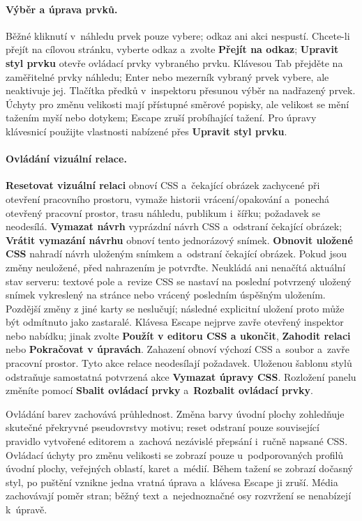 \documentclass[11pt,a4paper]{article}
\newcommand{\ui}[1]{\textbf{#1}}
\begin{document}
\paragraph{Výběr a úprava prvků.} Běžné kliknutí v~náhledu prvek pouze vybere;
odkaz ani akci nespustí. Chcete-li přejít na cílovou stránku, vyberte odkaz
a~zvolte \ui{Přejít na odkaz}; \ui{Upravit styl prvku} otevře ovládací prvky
vybraného prvku. Klávesou Tab přejděte na zaměřitelné prvky náhledu; Enter nebo
mezerník vybraný prvek vybere, ale neaktivuje jej. Tlačítka předků v~inspektoru
přesunou výběr na nadřazený prvek. Úchyty pro změnu velikosti mají přístupné
směrové popisky, ale velikost se mění tažením myší nebo dotykem; Escape zruší
probíhající tažení. Pro úpravy klávesnicí použijte vlastnosti nabízené přes
\ui{Upravit styl prvku}.

\paragraph{Ovládání vizuální relace.} \ui{Resetovat vizuální relaci} obnoví CSS
a~čekající obrázek zachycené při otevření pracovního prostoru, vymaže historii
vrácení/opakování a~ponechá otevřený pracovní prostor, trasu náhledu, publikum
i~šířku; požadavek se neodesílá. \ui{Vymazat návrh} vyprázdní návrh CSS
a~odstraní čekající obrázek; \ui{Vrátit vymazání návrhu} obnoví tento
jednorázový snímek. \ui{Obnovit uložené CSS} nahradí návrh uloženým snímkem
a~odstraní čekající obrázek. Pokud jsou změny neuložené, před nahrazením je
potvrďte. Neukládá ani nenačítá aktuální stav serveru: textové pole a~revize CSS
se nastaví na poslední potvrzený uložený snímek vykreslený na stránce nebo
vrácený posledním úspěšným uložením. Pozdější změny z jiné karty se neslučují;
následné explicitní uložení proto může být odmítnuto jako zastaralé. Klávesa
Escape nejprve zavře otevřený inspektor nebo nabídku; jinak zvolte \ui{Použít v
editoru CSS a ukončit}, \ui{Zahodit relaci} nebo \ui{Pokračovat v úpravách}.
Zahazení obnoví výchozí CSS a~soubor a~zavře pracovní prostor. Tyto akce relace
neodesílají požadavek. Uloženou šablonu stylů odstraňuje samostatná potvrzená
akce \ui{Vymazat úpravy CSS}. Rozložení panelu změníte pomocí \ui{Sbalit
ovládací prvky} a~\ui{Rozbalit ovládací prvky}.

Ovládání barev zachovává průhlednost. Změna barvy úvodní plochy zohledňuje
skutečné překryvné pseudovrstvy motivu; reset odstraní pouze související
pravidlo vytvořené editorem a~zachová nezávislé přepsání i~ručně napsané CSS.
Ovládací úchyty pro změnu velikosti se zobrazí pouze u~podporovaných profilů
úvodní plochy, veřejných oblastí, karet a~médií. Během tažení se zobrazí dočasný
styl, po puštění vznikne jedna vratná úprava a~klávesa Escape ji zruší. Média
zachovávají poměr stran; běžný text a~nejednoznačné osy rozvržení se nenabízejí
k~úpravě.
\end{document}
